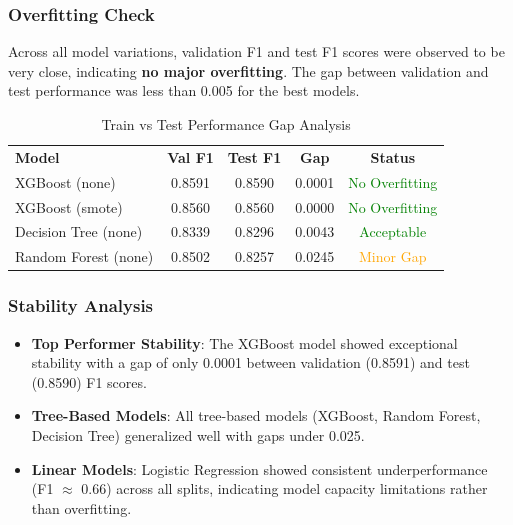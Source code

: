 \documentclass[12pt, a4paper]{article}
\begin{document}
\subsubsection{Overfitting Check}
Across all model variations, validation F1 and test F1 scores were observed to be very close, indicating \textbf{no major overfitting}. The gap between validation and test performance was less than 0.005 for the best models.

\begin{table}[ht]
\centering
\caption{Train vs Test Performance Gap Analysis}
\label{tab:overfitting_check}
\renewcommand{\arraystretch}{1.3}
\begin{tabular}{l c c c c}
\rowcolor{slate}
{\color{white}\small\bfseries Model} &
{\color{white}\small\bfseries Val F1} &
{\color{white}\small\bfseries Test F1} &
{\color{white}\small\bfseries Gap} &
{\color{white}\small\bfseries Status} \\
\rowcolor{lightgray}
XGBoost (none) & 0.8591 & 0.8590 & 0.0001 & \textcolor{green}{No Overfitting} \\
\rowcolor{white}
XGBoost (smote) & 0.8560 & 0.8560 & 0.0000 & \textcolor{green}{No Overfitting} \\
\rowcolor{lightgray}
Decision Tree (none) & 0.8339 & 0.8296 & 0.0043 & \textcolor{green}{Acceptable} \\
\rowcolor{white}
Random Forest (none) & 0.8502 & 0.8257 & 0.0245 & \textcolor{orange}{Minor Gap} \\
\end{tabular}
\end{table}

\subsubsection{Stability Analysis}
\begin{itemize}
    \item \textbf{Top Performer Stability}: The XGBoost model showed exceptional stability with a gap of only 0.0001 between validation (0.8591) and test (0.8590) F1 scores.
    \item \textbf{Tree-Based Models}: All tree-based models (XGBoost, Random Forest, Decision Tree) generalized well with gaps under 0.025.
    \item \textbf{Linear Models}: Logistic Regression showed consistent underperformance (F1 $\approx$ 0.66) across all splits, indicating model capacity limitations rather than overfitting.
\end{itemize}
\end{document}
